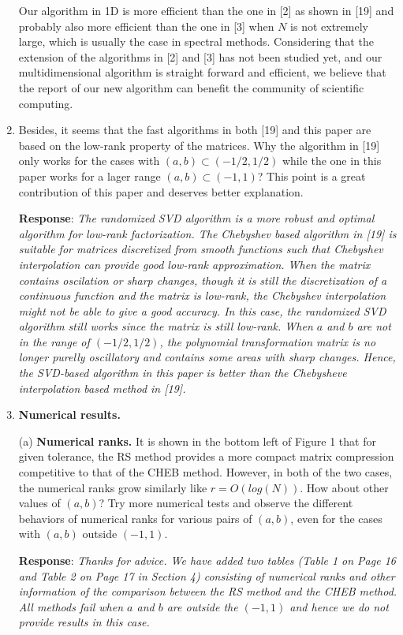 \documentclass[11pt]{article}
\newcommand{\Response}{{\bf Response}}
\begin{document}
\begin{enumerate}
{Our algorithm in 1D is more efficient than the one in [2] as shown in [19] and probably also more efficient than the one in [3] when $N$ is not extremely large, which is usually the case in spectral methods. Considering that the extension of the algorithms in [2] and [3] has not been studied yet, and our multidimensional algorithm is straight forward and efficient, we believe that the report of our new algorithm can benefit the community of scientific computing.}

\item {Besides, it seems that the fast algorithms in both [19] and this paper are based on
the low-rank property of the matrices. Why the algorithm in [19] only works for
the cases with $(a, b) \subset (-1/2, 1/2)$ while the one in this paper works for a lager
range $(a, b) \subset ( -1, 1)$? This point is a great contribution of this paper and deserves
better explanation.}

\Response: {\it The randomized SVD algorithm is a more robust and optimal algorithm for low-rank factorization. The Chebyshev based algorithm in [19] is suitable for matrices discretized from smooth functions such that Chebyshev interpolation can provide good low-rank approximation. When the matrix contains oscilation or sharp changes, though it is still the discretization of a continuous function and the matrix is low-rank, the Chebyshev interpolation might not be able to give a good accuracy. In this case, the randomized SVD algorithm still works since the matrix is still low-rank. When $a$ and $b$ are not in the range of $(-1/2,1/2)$, the polynomial transformation matrix is no longer purelly oscillatory and contains some areas with sharp changes. Hence, the SVD-based algorithm in this paper is better than the Chebysheve interpolation based method in [19].}

\item \textbf{Numerical results.}

 (a) \textbf{Numerical ranks.} It is shown in the bottom left of Figure 1 that for given
tolerance, the RS method provides a more compact matrix compression competitive to that of the CHEB method. However, in both of the two cases, the
numerical ranks grow similarly like $r = O(log(N))$. How about other values
of $(a, b)$? Try more numerical tests and observe the different behaviors of numerical ranks for various pairs of $(a, b)$, even for the cases with $(a, b)$ outside $(-1, 1)$.

\Response: {\it Thanks for advice. We have added two tables (Table 1 on Page 16 and Table 2 on Page 17 in Section 4) consisting of numerical ranks and other information of the comparison between the RS method and the CHEB method. All methods fail when $a$ and $b$ are outside the $(-1,1)$ and hence we do not provide results in this case.}


\end{enumerate}
\end{document}
